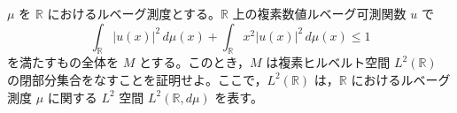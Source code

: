 \documentclass[12pt]{jlreq}
\begin{document}
$\mu$ を $\mathbb{R}$ におけるルベーグ測度とする。$\mathbb{R}$ 上の複素数値ルベーグ可測関数 $u$ で
\[
  \int_{\mathbb{R}} |u(x)|^2 \, d\mu(x) + \int_{\mathbb{R}} x^2 |u(x)|^2 \, d\mu(x) \le 1
\]
を満たすもの全体を $M$ とする。このとき，$M$ は複素ヒルベルト空間 $L^2(\mathbb{R})$ の閉部分集合をなすことを証明せよ。ここで，$L^2(\mathbb{R})$ は，$\mathbb{R}$ におけるルベーグ測度 $\mu$ に関する $L^2$ 空間 $L^2(\mathbb{R}, d\mu)$ を表す。
\end{document}
